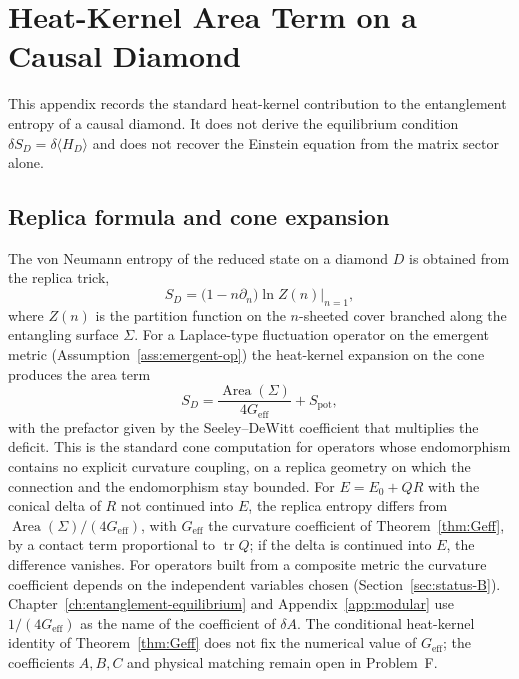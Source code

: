 \chapter{Heat-Kernel Area Term on a Causal Diamond}
\label{app:matrix_entropy}

This appendix records the standard heat-kernel contribution to the
entanglement entropy of a causal diamond. It does not derive the
equilibrium condition \(\delta S_D=\delta\langle H_D\rangle\) and does
not recover the Einstein equation from the matrix sector alone.

\section{Replica formula and cone expansion}
\label{sec:replica-cone}

The von Neumann entropy of the reduced state on a diamond \(D\) is
obtained from the replica trick,
\begin{equation}
  S_D=\bigl(1-n\partial_n\bigr)\ln Z(n)\Big|_{n=1},
\end{equation}
where \(Z(n)\) is the partition function on the \(n\)-sheeted cover
branched along the entangling surface \(\Sigma\). For a Laplace-type fluctuation operator on the emergent metric
(Assumption~\ref{ass:emergent-op}) the heat-kernel expansion on the
cone produces the area term
\begin{equation}
  S_D=\frac{\operatorname{Area}(\Sigma)}{4G_{\mathrm{eff}}}+S_{\mathrm{pot}},
\end{equation}
with the prefactor given by the Seeley--DeWitt coefficient that multiplies the
deficit. This is the standard cone computation for operators whose
endomorphism contains no explicit curvature coupling, on a replica geometry on
which the connection and the endomorphism stay bounded. For
\(E=E_0+QR\) with the conical delta of \(R\) not continued into \(E\), the
replica entropy differs from
\(\operatorname{Area}(\Sigma)/(4G_{\mathrm{eff}})\), with
\(G_{\mathrm{eff}}\) the curvature coefficient of Theorem~\ref{thm:Geff}, by
a contact term proportional to \(\operatorname{tr}Q\); if the delta is
continued into \(E\), the difference vanishes. For operators built from a
composite metric the curvature coefficient depends on the independent variables
chosen (Section~\ref{sec:status-B}). Chapter~\ref{ch:entanglement-equilibrium}
and Appendix~\ref{app:modular} use \(1/(4G_{\mathrm{eff}})\) as the name of
the coefficient of \(\delta A\). The conditional heat-kernel identity of Theorem~\ref{thm:Geff}
does not fix the numerical value of \(G_{\mathrm{eff}}\); the
coefficients \(A,B,C\) and physical matching remain open in
Problem~F.

